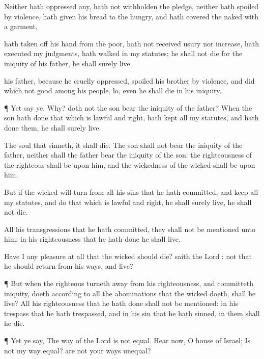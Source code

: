 {Neither hath
oppressed
any, hath not
withholden the
pledge, neither hath
spoiled by
violence,
{} hath
given his
bread to the
hungry, and hath
covered the
naked with a
garment,

 hath taken
off his
hand from the
poor,
{} hath not
received
usury nor
increase, hath
executed my
judgments, hath
walked in my
statutes; he shall not
die for the
iniquity of his
father, he shall
surely
live.

 his
father, because he
cruelly
oppressed,
spoiled his
brother by
violence, and
did
{} which
{} not
good
among his
people, lo, even he shall
die in his
iniquity.


\par }{\PP {}¶ Yet
say ye, Why? doth not the
son
bear the
iniquity of the
father? When the
son hath
done that which is
lawful and
right,
{} hath
kept all my
statutes, and hath
done them, he shall
surely
live.

The
soul that
sinneth, it shall
die. The
son shall not
bear the
iniquity of the
father, neither shall the
father
bear the
iniquity of the
son: the
righteousness of the
righteous shall be upon him, and the
wickedness of the
wicked shall be upon him.


\par }{\PP {}But if the
wicked will
turn from all his
sins that he hath
committed, and
keep all my
statutes, and
do that which is
lawful and
right, he shall
surely
live, he shall not
die.

All his
transgressions that he hath
committed, they shall not be
mentioned unto him: in his
righteousness that he hath
done he shall
live.

Have I any
pleasure at
all that the
wicked should
die?
saith the
Lord
{}:
{} not that he should
return from his
ways, and
live?


\par }{\PP {}¶ But when the
righteous turneth
away from his
righteousness, and
committeth
iniquity,
{}
doeth according to all the
abominations that the
wicked
{}
doeth, shall he
live? All his
righteousness that he hath
done shall not be
mentioned: in his
trespass that he hath
trespassed, and in his
sin that he hath
sinned, in them shall he
die.


\par }{\PP {}¶ Yet ye
say, The
way of the
Lord is not
equal.
Hear now, O
house of
Israel; Is not my
way
equal? are not your
ways
unequal?

}
